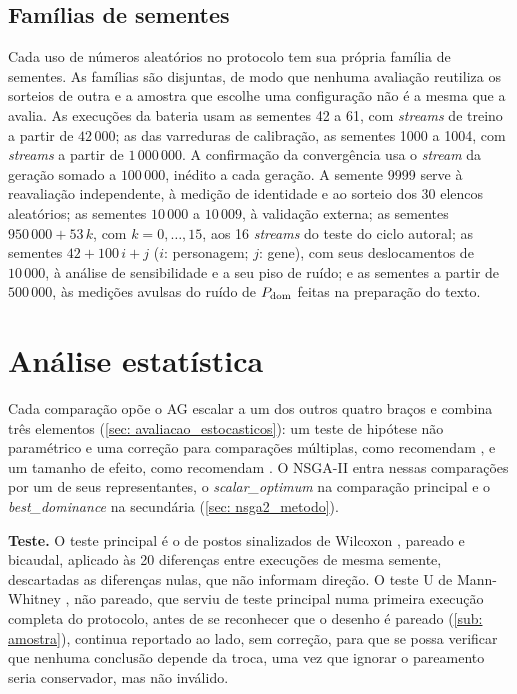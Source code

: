\subsection{Famílias de sementes}
\label{sub: sementes}

Cada uso de números aleatórios no protocolo tem sua própria família de sementes. As famílias são disjuntas, de modo que nenhuma avaliação reutiliza os sorteios de outra e a amostra que escolhe uma configuração não é a mesma que a avalia. As execuções da bateria usam as sementes 42 a 61, com \textit{streams} de treino a partir de $42\,000$; as das varreduras de calibração, as sementes 1000 a 1004, com \textit{streams} a partir de $1\,000\,000$. A confirmação da convergência usa o \textit{stream} da geração somado a $100\,000$, inédito a cada geração. A semente 9999 serve à reavaliação independente, à medição de identidade e ao sorteio dos 30 elencos aleatórios; as sementes $10\,000$ a $10\,009$, à validação externa; as sementes $950\,000 + 53\,k$, com $k = 0, \ldots, 15$, aos 16 \textit{streams} do teste do ciclo autoral; as sementes $42 + 100\,i + j$ ($i$: personagem; $j$: gene), com seus deslocamentos de $10\,000$, à análise de sensibilidade e a seu piso de ruído; e as sementes a partir de $500\,000$, às medições avulsas do ruído de $P_{\mathrm{dom}}$ feitas na preparação do texto.

\section{Análise estatística}
\label{sec: estatistica}

Cada comparação opõe o AG escalar a um dos outros quatro braços e combina três elementos (\autoref{sec: avaliacao_estocasticos}): um teste de hipótese não paramétrico e uma correção para comparações múltiplas, como recomendam , e um tamanho de efeito, como recomendam . O NSGA-II entra nessas comparações por um de seus representantes, o \textit{scalar\_optimum} na comparação principal e o \textit{best\_dominance} na secundária (\autoref{sec: nsga2_metodo}).

\textbf{Teste.} O teste principal é o de postos sinalizados de Wilcoxon \cite{wilcoxon1945individual}, pareado e bicaudal, aplicado às 20 diferenças entre execuções de mesma semente, descartadas as diferenças nulas, que não informam direção. O teste U de Mann-Whitney \cite{mann1947test}, não pareado, que serviu de teste principal numa primeira execução completa do protocolo, antes de se reconhecer que o desenho é pareado (\autoref{sub: amostra}), continua reportado ao lado, sem correção, para que se possa verificar que nenhuma conclusão depende da troca, uma vez que ignorar o pareamento seria conservador, mas não inválido.

